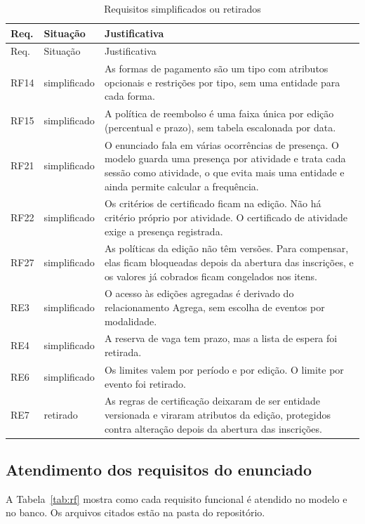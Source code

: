 \begin{longtable}{@{}l L{3.4cm} L{9.6cm}@{}}
\caption{Requisitos simplificados ou retirados}\label{tab:simplificados}\\
\toprule
Req. & Situação & Justificativa\\
\midrule
\endfirsthead
\toprule
Req. & Situação & Justificativa\\
\midrule
\endhead
\bottomrule
\endfoot
RF14 & simplificado & As formas de pagamento são um tipo com atributos opcionais e restrições por tipo, sem uma entidade para cada forma.\\
RF15 & simplificado & A política de reembolso é uma faixa única por edição (percentual e prazo), sem tabela escalonada por data.\\
RF21 & simplificado & O enunciado fala em várias ocorrências de presença. O modelo guarda uma presença por atividade e trata cada sessão como atividade, o que evita mais uma entidade e ainda permite calcular a frequência.\\
RF22 & simplificado & Os critérios de certificado ficam na edição. Não há critério próprio por atividade. O certificado de atividade exige a presença registrada.\\
RF27 & simplificado & As políticas da edição não têm versões. Para compensar, elas ficam bloqueadas depois da abertura das inscrições, e os valores já cobrados ficam congelados nos itens.\\
RE3 & simplificado & O acesso às edições agregadas é derivado do relacionamento Agrega, sem escolha de eventos por modalidade.\\
RE4 & simplificado & A reserva de vaga tem prazo, mas a lista de espera foi retirada.\\
RE6 & simplificado & Os limites valem por período e por edição. O limite por evento foi retirado.\\
RE7 & retirado & As regras de certificação deixaram de ser entidade versionada e viraram atributos da edição, protegidos contra alteração depois da abertura das inscrições.\\
\end{longtable}

\subsection{Atendimento dos requisitos do enunciado}

A Tabela~\ref{tab:rf} mostra como cada requisito funcional é atendido no modelo e no banco. Os arquivos citados estão na pasta  do repositório.

